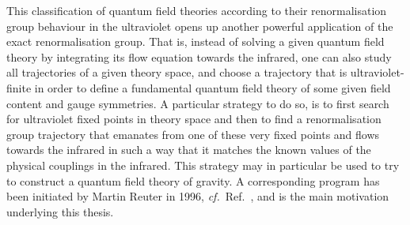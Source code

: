 \documentclass[11pt]{book}
\newcommand\cf{\textit{cf.}\ }
\numberwithin{equation}{chapter}
\begin{document}
This classification of quantum field theories according
to their renormalisation group behaviour in the ultraviolet
opens up another powerful application of the exact
renormalisation group. That is, instead of solving a given
quantum field theory by integrating its flow equation
towards the infrared, one can also study all trajectories
of a given theory space, and choose a trajectory that is
ultraviolet-finite in order to define a fundamental
quantum field theory of some given field content and
gauge symmetries. A particular strategy to do so,
is to first search for ultraviolet fixed points in theory space
and then to find a renormalisation group trajectory that
emanates from one of these very fixed points and flows
towards the infrared in such a way that it matches
the known values of the physical couplings in the infrared.
This strategy may in particular be used to try to construct
a quantum field theory of gravity.
A corresponding program has been initiated
by Martin Reuter in 1996, \cf Ref.~\cite{Reuter:1996cp},
and is the main motivation underlying this thesis.
\end{document}
